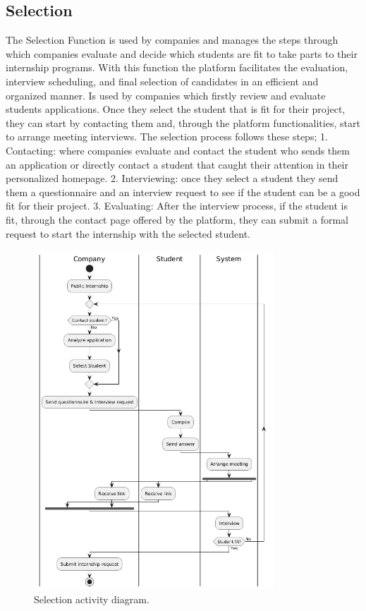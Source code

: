 \subsection{Selection}
The Selection Function is used by companies and manages the steps through which companies evaluate and decide which students are fit to take parts to their internship programs. With this function the platform facilitates the evaluation, interview scheduling, and final selection of candidates in an efficient and organized manner. Is used by companies which firstly review and evaluate students applications. Once they select the student that is fit for their project, they can start by contacting them and, through the platform functionalities, start to arrange meeting interviews. 
The selection process follows these steps;
1.	Contacting: where companies evaluate and contact the student who sends them an application or directly contact a student that caught their attention in their personalized homepage.
2.	Interviewing: once they select a student they send them a questionnaire and an interview request to see if the student can be a good fit for their project. 
3. Evaluating: After the interview process, if the student is fit, through the contact page offered by the platform, they can submit a formal request to start the internship with the selected student.
\begin{figure}[H]
        \centering
        \includegraphics[width=0.8\textwidth]{RASD/Assets/ActivityDiagram/Selection_AD2.png}
        \caption{Selection activity diagram.}
        \label{fig:Selection activity diagram.}
    \end{figure}

